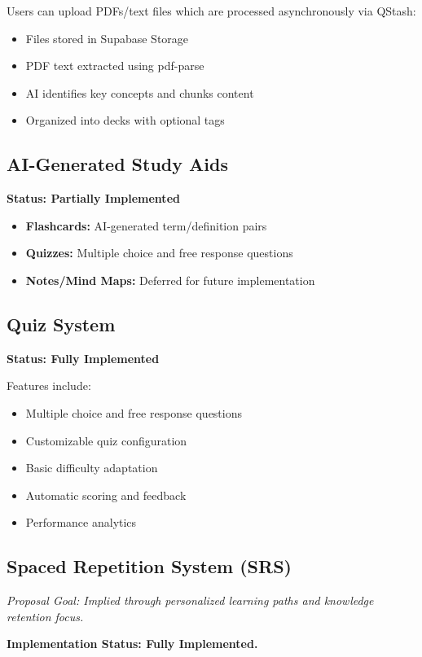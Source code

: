 \documentclass[
	letterpaper,
	11pt
]{jdf}
\begin{document}
Users can upload PDFs/text files which are processed asynchronously via QStash:
\begin{itemize}[noitemsep]
    \item Files stored in Supabase Storage
    \item PDF text extracted using pdf-parse
    \item AI identifies key concepts and chunks content
    \item Organized into decks with optional tags
\end{itemize}

\subsection{AI-Generated Study Aids}
\textbf{Status: Partially Implemented}

\begin{itemize}[noitemsep]
    \item \textbf{Flashcards:} AI-generated term/definition pairs
    \item \textbf{Quizzes:} Multiple choice and free response questions
    \item \textbf{Notes/Mind Maps:} Deferred for future implementation
\end{itemize}

\subsection{Quiz System}
\textbf{Status: Fully Implemented}

Features include:
\begin{itemize}[noitemsep]
    \item Multiple choice and free response questions
    \item Customizable quiz configuration
    \item Basic difficulty adaptation
    \item Automatic scoring and feedback
    \item Performance analytics
\end{itemize}

\subsection{Spaced Repetition System (SRS)}
\textit{Proposal Goal: Implied through personalized learning paths and knowledge retention focus.}

\textbf{Implementation Status: Fully Implemented.}
\end{document}
